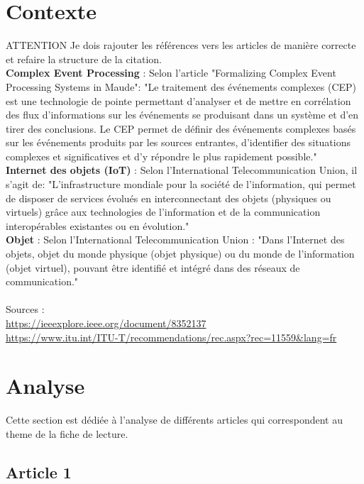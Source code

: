 \documentclass[12pt]{article}
\begin{document}
\newpage

\section{Contexte}

ATTENTION Je dois rajouter les références vers les articles de manière correcte et refaire la structure de la citation.
\\

\textbf{Complex Event Processing} : Selon l'article "Formalizing Complex Event Processing Systems in Maude": "Le traitement des événements complexes (CEP) est une technologie de pointe permettant d'analyser et de mettre en corrélation des flux d'informations sur les événements se produisant dans un système et d'en tirer des conclusions. Le CEP permet de définir des événements complexes basés sur les événements produits par les sources entrantes, d'identifier des situations complexes et significatives et d'y répondre le plus rapidement possible."\\

\textbf{Internet des objets (IoT)} : Selon l'International Telecommunication Union, il s'agit de: "L'infrastructure mondiale pour la société de l'information, qui permet de disposer de services évolués en interconnectant des objets (physiques ou virtuels) grâce aux technologies de l'information et de la communication interopérables existantes ou en évolution." \\

\textbf{Objet} : Selon l'International Telecommunication Union : "Dans l'Internet des objets, objet du monde physique (objet physique) ou du monde de l'information (objet virtuel), pouvant être identifié et intégré dans des réseaux de communication."
\\ \\
Sources : \\
\url{https://ieeexplore.ieee.org/document/8352137} \\
\url{https://www.itu.int/ITU-T/recommendations/rec.aspx?rec=11559&lang=fr}


\section{Analyse}

Cette section est dédiée à l'analyse de différents articles qui correspondent au theme de la fiche de lecture.


\subsection{Article 1}
\end{document}
